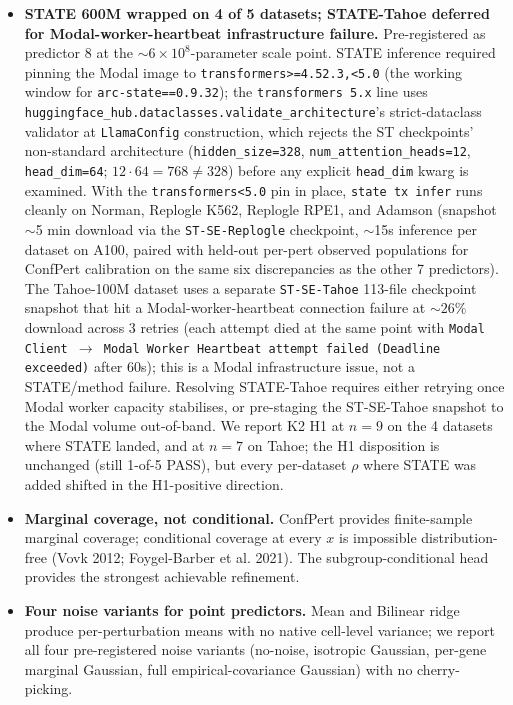 \documentclass{article}
\begin{document}
\begin{itemize}
\item \textbf{STATE 600M wrapped on 4 of 5 datasets; STATE-Tahoe deferred for Modal-worker-heartbeat infrastructure failure.} Pre-registered as predictor 8 at the $\sim 6 \times 10^8$-parameter scale point. STATE inference required pinning the Modal image to \texttt{transformers>=4.52.3,<5.0} (the working window for \texttt{arc-state==0.9.32}); the \texttt{transformers~5.x} line uses \texttt{huggingface\_hub.dataclasses.validate\_architecture}'s strict-dataclass validator at \texttt{LlamaConfig} construction, which rejects the ST checkpoints' non-standard architecture (\texttt{hidden\_size=328}, \texttt{num\_attention\_heads=12}, \texttt{head\_dim=64}; $12 \cdot 64 = 768 \neq 328$) before any explicit \texttt{head\_dim} kwarg is examined. With the \texttt{transformers<5.0} pin in place, \texttt{state tx infer} runs cleanly on Norman, Replogle K562, Replogle RPE1, and Adamson (snapshot $\sim$5 min download via the \texttt{ST-SE-Replogle} checkpoint, $\sim$15s inference per dataset on A100, paired with held-out per-pert observed populations for ConfPert calibration on the same six discrepancies as the other 7 predictors). The Tahoe-100M dataset uses a separate \texttt{ST-SE-Tahoe} 113-file checkpoint snapshot that hit a Modal-worker-heartbeat connection failure at $\sim 26\%$ download across 3 retries (each attempt died at the same point with \texttt{Modal Client $\to$ Modal Worker Heartbeat attempt failed (Deadline exceeded)} after 60s); this is a Modal infrastructure issue, not a STATE/method failure. Resolving STATE-Tahoe requires either retrying once Modal worker capacity stabilises, or pre-staging the ST-SE-Tahoe snapshot to the Modal volume out-of-band. We report K2 H1 at $n = 9$ on the 4 datasets where STATE landed, and at $n = 7$ on Tahoe; the H1 disposition is unchanged (still 1-of-5 PASS), but every per-dataset $\rho$ where STATE was added shifted in the H1-positive direction.
\item \textbf{Marginal coverage, not conditional.} ConfPert provides finite-sample marginal coverage; conditional coverage at every $x$ is impossible distribution-free (Vovk 2012; Foygel-Barber et al. 2021). The \citet{cauchois2024} subgroup-conditional head provides the strongest achievable refinement.
\item \textbf{Four noise variants for point predictors.} Mean and Bilinear ridge produce per-perturbation means with no native cell-level variance; we report all four pre-registered noise variants (no-noise, isotropic Gaussian, per-gene marginal Gaussian, full empirical-covariance Gaussian) with no cherry-picking.

\end{itemize}
\end{document}
